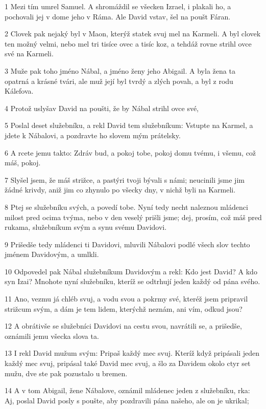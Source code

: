 \par 1 Mezi tím umrel Samuel. A shromáždil se všecken Izrael, i plakali ho, a pochovali jej v dome jeho v Ráma. Ale David vstav, šel na poušt Fáran.
\par 2 Clovek pak nejaký byl v Maon, kterýž statek svuj mel na Karmeli. A byl clovek ten možný velmi, nebo mel tri tisíce ovec a tisíc koz, a tehdáž rovne strihl ovce své na Karmeli.
\par 3 Muže pak toho jméno Nábal, a jméno ženy jeho Abigail. A byla žena ta opatrná a krásné tvári, ale muž její byl tvrdý a zlých povah, a byl z rodu Kálefova.
\par 4 Protož uslyšav David na poušti, že by Nábal strihl ovce své,
\par 5 Poslal deset služebníku, a rekl David tem služebníkum: Vstupte na Karmel, a jdete k Nábalovi, a pozdravte ho slovem mým prátelsky.
\par 6 A rcete jemu takto: Zdráv bud, a pokoj tobe, pokoj domu tvému, i všemu, což máš, pokoj.
\par 7 Slyšel jsem, že máš strižce, a pastýri tvoji bývali s námi; neucinili jsme jim žádné krivdy, aniž jim co zhynulo po všecky dny, v nichž byli na Karmeli.
\par 8 Ptej se služebníku svých, a povedí tobe. Nyní tedy necht naleznou mládenci milost pred ocima tvýma, nebo v den veselý prišli jsme; dej, prosím, což máš pred rukama, služebníkum svým a synu svému Davidovi.
\par 9 Prišedše tedy mládenci ti Davidovi, mluvili Nábalovi podlé všech slov techto jménem Davidovým, a umlkli.
\par 10 Odpovedel pak Nábal služebníkum Davidovým a rekl: Kdo jest David? A kdo syn Izai? Mnohote nyní služebníku, kteríž se odtrhují jeden každý od pána svého.
\par 11 Ano, vezmu já chléb svuj, a vodu svou a pokrmy své, kteréž jsem pripravil strižcum svým, a dám je tem lidem, kterýchž neznám, ani vím, odkud jsou?
\par 12 A obrátivše se služebníci Davidovi na cestu svou, navrátili se, a prišedše, oznámili jemu všecka slova ta.
\par 13 I rekl David mužum svým: Pripaš každý mec svuj. Kteríž když pripásali jeden každý mec svuj, pripásal také David mec svuj, a šlo za Davidem okolo ctyr set mužu, dve ste pak pozustalo u bremen.
\par 14 A v tom Abigail, žene Nábalove, oznámil mládenec jeden z služebníku, rka: Aj, poslal David posly s poušte, aby pozdravili pána našeho, ale on je ukrikal;

